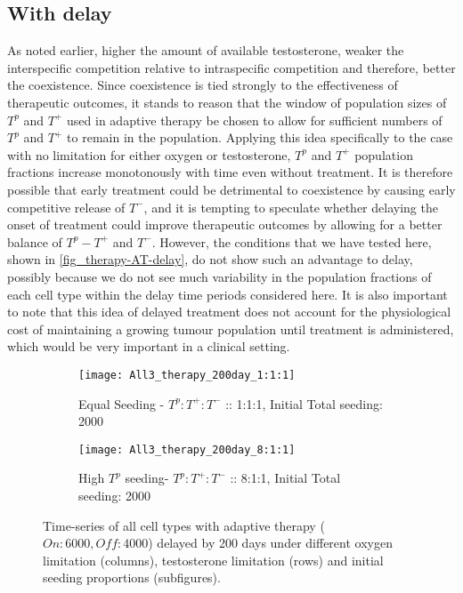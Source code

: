 \clearpage

\subsection{With delay}
As noted earlier, higher the amount of available testosterone, weaker the interspecific competition relative to intraspecific competition and therefore, better the coexistence. Since coexistence is tied strongly to the effectiveness of therapeutic outcomes, it stands to reason that the window of population sizes of $T^p$ and $T^+$ used in adaptive therapy be chosen to allow for sufficient numbers of $T^p$ and $T^+$ to remain in the population. Applying this idea specifically to the case with no limitation for either oxygen or testosterone, $T^p$ and $T^+$ population fractions increase monotonously with time even without treatment. It is therefore possible that early treatment could be detrimental to coexistence by causing early competitive release of $T^-$, and it is tempting to speculate whether delaying the onset of treatment could improve therapeutic outcomes by allowing for a better balance of $T^p - T^+$ and $T^-$. However, the conditions that we have tested here, shown in \autoref{fig_therapy-AT-delay}, do not show such an advantage to delay, possibly because we do not see much variability in the population fractions of each cell type within the delay time periods considered here. It is also important to note that this idea of delayed treatment does not account for the physiological cost of maintaining a growing tumour population until treatment is administered, which would be very important in a clinical setting.

\begin{figure}[h!]
  \centering
  \begin{subfigure}[b]{\textwidth}
    \centering
    \texttt{[image: All3\_therapy\_200day\_1:1:1]}
    \caption{Equal Seeding - $T^p:T^+:T^-$ :: 1:1:1, Initial Total seeding: 2000}
    \label{fig_therapy-AT-delay200_1:1:1-2000}
  \end{subfigure}
  \begin{subfigure}[b]{\textwidth}
    \centering
    \texttt{[image: All3\_therapy\_200day\_8:1:1]}
    \caption{High $T^p$ seeding- $T^p:T^+:T^-$ :: 8:1:1, Initial Total seeding: 2000}
    \label{fig_therapy-AT-delay200_8:1:1-2000}
  \end{subfigure}
  \caption[Time-series of all cell types with delayed adaptive therapy]{Time-series of all cell types with adaptive therapy ($On:6000, Off:4000$) delayed by 200 days under different oxygen limitation (columns), testosterone limitation (rows) and initial seeding proportions (subfigures).}
  \label{fig_therapy-AT-delay}
\end{figure}

